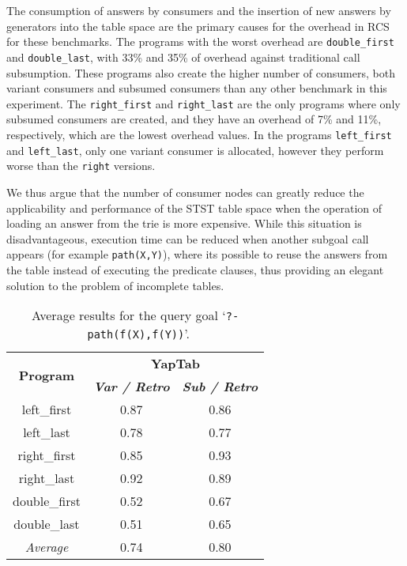 The consumption of answers by consumers and the insertion of new answers by generators into the table
space are the primary causes for the overhead in RCS for these benchmarks. The programs with the
worst overhead are \texttt{double\_first} and \texttt{double\_last}, with 33\% and 35\% of overhead
against traditional call subsumption. These programs also create the higher number of consumers,
both variant consumers and subsumed consumers than any other benchmark in this experiment.
The \texttt{right\_first} and \texttt{right\_last} are the only programs where only subsumed
consumers are created, and they have an overhead of 7\% and 11\%, respectively, which are the lowest
overhead values. In the programs \texttt{left\_first} and \texttt{left\_last}, only one variant
consumer is allocated, however they perform worse than the \texttt{right} versions.

We thus argue that the number of consumer nodes can greatly reduce the
applicability and performance of the STST table space when the operation of loading an answer
from the trie is more expensive. While this situation is disadvantageous, execution time can
be reduced when another subgoal call appears (for example \texttt{path(X,Y)}), where its possible to
reuse the answers from the table instead of executing the predicate clauses, thus providing an
elegant solution to the problem of incomplete tables.

\begin{table}[ht]
\centering
  \begin{tabular}{ccc}
   \hline
    \hline
    \multirow{2}{*}{\textbf{Program}} & \multicolumn{2}{c}{\textbf{YapTab}} \\
    & \textbf{\textit{\small{Var / Retro}}} & \textbf{\textit{\small{Sub / Retro}}} \\
   \hline
   \hline
   left\_first & 0.87 & 0.86 \\
   left\_last & 0.78 & 0.77 \\
   right\_first & 0.85 & 0.93 \\
   right\_last & 0.92 & 0.89 \\
double\_first & 0.52 & 0.67 \\
double\_last & 0.51 & 0.65 \\

\hline
\hline
\textit{Average} & 0.74 &  0.80 \\
\hline
\hline
\end{tabular}
\caption{Average results for the query goal `\texttt{?-~path(f(X),f(Y))}'.}
\label{tbl:results_average_stst}
\end{table}

